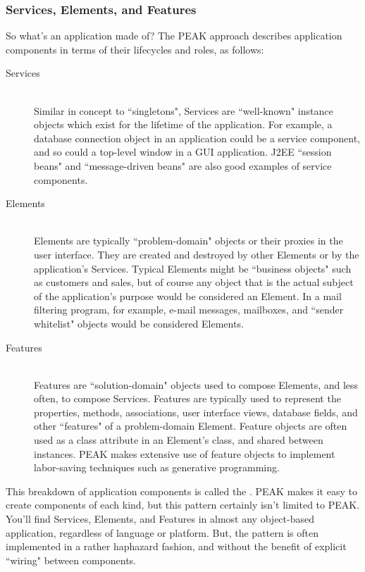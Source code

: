 \vfill






\subsubsection{Services, Elements, and Features}

So what's an application made of?  The PEAK approach describes application
components in terms of their lifecycles and roles, as follows:

\begin{description}
\item[Services] \hfill \\ 
Similar in concept to ``singletons", Services are ``well-known" instance objects
which exist for the lifetime of the application.  For example, a database
connection object in an application could be a service component, and so could
a top-level window in a GUI application.  J2EE ``session beans" and
``message-driven beans" are also good examples of service components.

\item[Elements] \hfill \\ 
Elements are typically ``problem-domain" objects or their proxies in
the user interface.  They are created and destroyed by other Elements or
by the application's Services.  Typical Elements might be ``business objects"
such as customers and sales, but of course any object that is the actual
subject of the application's purpose would be considered an Element.  In a
mail filtering program, for example, e-mail messages, mailboxes, and
``sender whitelist" objects would be considered Elements.

\item[Features] \hfill \\
Features are ``solution-domain" objects used to compose Elements, and less
often, to compose Services.  Features are typically used to represent 
the properties, methods, associations, user interface views, database fields,
and other ``features" of a problem-domain Element.  Feature objects are often
used as a class attribute in an Element's class, and shared between instances.
PEAK makes extensive use of feature objects to implement labor-saving
techniques such as generative programming.

\end{description}

This breakdown of application components is called the
.  PEAK makes it easy to create 
components of each kind, but this pattern certainly isn't limited to PEAK.
You'll find Services, Elements, and Features in almost any object-based
application, regardless of language or platform.  But, the pattern is often
implemented in a rather haphazard fashion, and without the benefit of explicit
``wiring" between components.


